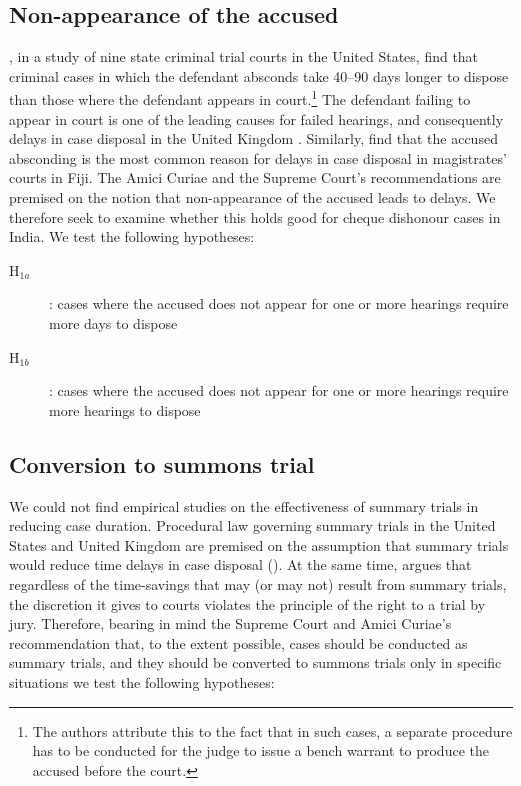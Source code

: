 \subsection{Non-appearance of the accused} 
\label{sec:non-appe-accus}

\textcite{ostrom2000efficiency}, in a study of nine state criminal trial courts in the United States, find that criminal cases in which the defendant absconds take 40--90 days longer to dispose than those where the defendant appears in court.\footnote{The authors attribute this to the fact that in such cases, a separate procedure has to be conducted for the judge to issue a bench warrant to produce the accused before the court.} The defendant failing to appear in court is one of the leading causes for failed hearings, and consequently delays in case disposal in the United Kingdom \autocite{crownProsecutionService2006_magistrateCourtEfficiency}. Similarly, \textcite{llangasinghe1988_fijiJudicialDelays} find that the accused absconding is the most common reason for delays in case disposal in magistrates' courts in Fiji. The Amici Curiae and the Supreme Court's recommendations are premised on the notion that non-appearance of the accused leads to delays. We therefore seek to examine whether this holds good for cheque dishonour cases in India. We test the following hypotheses:

\begin{description}
\item[H$_{1a}$] : cases where the accused does not appear for one or more hearings require more days to dispose
\item[H$_{1b}$] : cases where the accused does not appear for one or more hearings require more hearings to dispose
\end{description}

\subsection{Conversion to summons trial}
\label{sec:conv-summ-trial}

We could not find empirical studies on the effectiveness of summary trials in reducing case duration. Procedural law governing summary trials in the United States and United Kingdom are premised on the assumption that summary trials would reduce time delays in case disposal (\autocite{miller2003}). At the same time, \textcite{miller2003} argues that regardless of the time-savings that may (or may not) result from summary trials, the discretion it gives to courts violates the principle of the right to a trial by jury. Therefore, bearing in mind the Supreme Court and Amici Curiae's recommendation that, to the extent possible, cases should be conducted as summary trials, and they should be converted to summons trials only in specific situations we test the following hypotheses:

